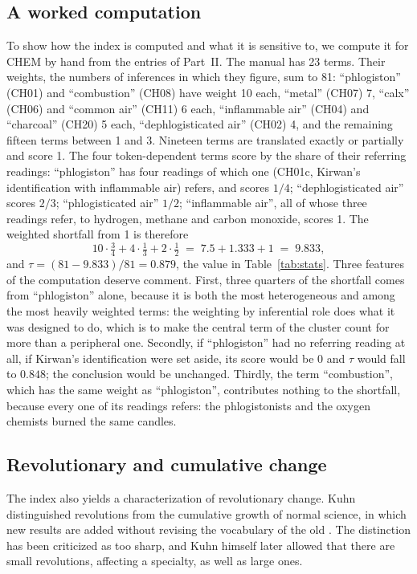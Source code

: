\documentclass{situationist-preprint}
\begin{document}
\subsection{A worked computation}

To show how the index is computed and what it is sensitive to, we compute it for CHEM by hand from the entries of Part~II. The manual has 23 terms. Their weights, the numbers of inferences in which they figure, sum to 81: \enquote{phlogiston} (CH01) and \enquote{combustion} (CH08) have weight 10 each, \enquote{metal} (CH07) 7, \enquote{calx} (CH06) and \enquote{common air} (CH11) 6 each, \enquote{inflammable air} (CH04) and \enquote{charcoal} (CH20) 5 each, \enquote{dephlogisticated air} (CH02) 4, and the remaining fifteen terms between 1 and 3. Nineteen terms are translated exactly or partially and score 1. The four token-dependent terms score by the share of their referring readings: \enquote{phlogiston} has four readings of which one (CH01c, Kirwan's identification with inflammable air) refers, and scores $1/4$; \enquote{dephlogisticated air} scores $2/3$; \enquote{phlogisticated air} $1/2$; \enquote{inflammable air}, all of whose three readings refer, to hydrogen, methane and carbon monoxide, scores 1. The weighted shortfall from 1 is therefore
\[
10\cdot\tfrac34 + 4\cdot\tfrac13 + 2\cdot\tfrac12 \;=\; 7.5 + 1.333 + 1 \;=\; 9.833,
\]
and $\tau = (81 - 9.833)/81 = 0.879$, the value in Table~\ref{tab:stats}. Three features of the computation deserve comment. First, three quarters of the shortfall comes from \enquote{phlogiston} alone, because it is both the most heterogeneous and among the most heavily weighted terms: the weighting by inferential role does what it was designed to do, which is to make the central term of the cluster count for more than a peripheral one. Secondly, if \enquote{phlogiston} had no referring reading at all, if Kirwan's identification were set aside, its score would be 0 and $\tau$ would fall to $0.848$; the conclusion would be unchanged. Thirdly, the term \enquote{combustion}, which has the same weight as \enquote{phlogiston}, contributes nothing to the shortfall, because every one of its readings refers: the phlogistonists and the oxygen chemists burned the same candles.

\subsection{Revolutionary and cumulative change}

The index also yields a characterization of revolutionary change. Kuhn distinguished revolutions from the cumulative growth of normal science, in which new results are added without revising the vocabulary of the old \citep{Kuhn1970}. The distinction has been criticized as too sharp, and Kuhn himself later allowed that there are small revolutions, affecting a specialty, as well as large ones.
\end{document}
